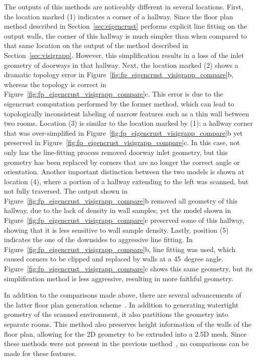 \documentclass[12pt,onecolumn,oneside]{book}
\begin{document}
The outputs of this methods are noticeably different in several locations.  First, the location marked (1) indicates a corner of a hallway.  Since the floor plan method described in Section~\ref{sec:eigencrust} performs explicit line fitting on the output walls, the corner of this hallway is much simpler than when compared to that same location on the output of the method described in Section~\ref{sec:visigrapp}.  However, this simplification results in a loss of the inlet geometry of doorways in that hallway.  Next, the location marked (2) shows a dramatic topology error in Figure~\ref{fig:fp_eigencrust_visigrapp_compare}b, whereas the topology is correct in Figure~\ref{fig:fp_eigencrust_visigrapp_compare}c.  This error is due to the eigencrust computation performed by the former method, which can lead to topologically inconsistent labeling of narrow features such as a thin wall between two rooms.  Location (3) is similar to the location marked by (1): a hallway corner that was over-simplified in Figure~\ref{fig:fp_eigencrust_visigrapp_compare}b yet preserved in Figure~\ref{fig:fp_eigencrust_visigrapp_compare}c.  In this case, not only has the line-fitting process removed doorway inlet geometry, but this geometry has been replaced by corners that are no longer the correct angle or orientation.  Another important distinction between the two models is shown at location (4), where a portion of a hallway extending to the left was scanned, but not fully traversed.  The output shown in Figure~\ref{fig:fp_eigencrust_visigrapp_compare}b removed all geometry of this hallway, due to the lack of density in wall samples, yet the model shown in Figure~\ref{fig:fp_eigencrust_visigrapp_compare}c preserved some of this hallway, showing that it is less sensitive to wall sample density.  Lastly, position (5) indicates the one of the downsides to aggressive line fitting.  In Figure~\ref{fig:fp_eigencrust_visigrapp_compare}b, line fitting was used, which caused corners to be clipped and replaced by walls at a 45~degree angle.  Figure~\ref{fig:fp_eigencrust_visigrapp_compare}c shows this same geometry, but its simplification method is less aggressive, resulting in more faithful geometry.

In addition to the comparisons made above, there are several advancements of the latter floor plan generation scheme~\cite{Turner14}.  In addition to generating watertight geometry of the scanned environment, it also partitions the geometry into separate rooms.  This method also preserves height information of the walls of the floor plan, allowing for the 2D geometry to be extruded into a 2.5D mesh.  Since these methods were not present in the previous method~\cite{Turner12}, no comparisons can be made for these features.
\end{document}
